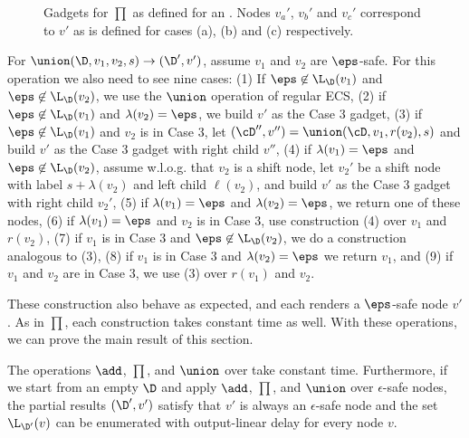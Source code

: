\begin{figure}[t]
	\caption{Gadgets for $\prod$ as defined for an \dsepsabbr. Nodes $v_a'$, $v_b'$ and $v_c'$ correspond to $v'$ as is defined for cases (a), (b) and (c) respectively.}
	\label{slps:fig-prod-multi-gadget}
\end{figure}

For $\union(\D,v_1,v_2, s) \to (\D',v')$, assume $v_1$ and $v_2$ are $\eps$-safe. 
For this operation we also need to see nine cases: (1) If $\eps\not\in\L_{\D}(v_1)$ and $\eps\not\in\L_{\D}(v_2)$, we use the $\union$ operation of regular ECS, (2) if $\eps\not\in\L_{\D}(v_1)$ and $\lambda(v_2) = \eps$, we build $v'$ as the Case 3 gadget, (3) if $\eps\not\in\L_{\D}(v_1)$ and $v_2$ is in Case 3, let $(\cD'', v'') = \union(\cD, v_1, r(v_2), s)$ and build $v'$ as the Case 3 gadget with right child $v''$, (4) if $\lambda(v_1) = \eps$ and $\eps\not\in\L_{\D}(v_2)$, assume w.l.o.g. that $v_2$ is a shift node, let $v_2'$ be a shift node with label $s + \lambda(v_2)$ and left child $\ell(v_2)$, and build $v'$ as the Case 3 gadget with right child $v_2'$, (5) if $\lambda(v_1) = \eps$ and $\lambda(v_2) = \eps$, we return one of these nodes, (6) if $\lambda(v_1) = \eps$ and $v_2$ is in Case 3, use construction (4) over $v_1$ and $ r(v_2)$, (7) if $v_1$ is in Case 3 and $\eps\not\in\L_{\D}(v_2)$, we do a construction analogous to (3), (8) if $v_1$ is in Case 3 and $\lambda(v_2) = \eps$ we return $v_1$, and (9) if $v_1$ and $v_2$ are in Case 3, we use (3) over $r(v_1)$ and $v_2$.

These construction also behave as expected, and each renders a $\eps$-safe node $v'$. As in $\prod$, each construction takes constant time as well. With these operations,	 we can prove the main result of this section.

\begin{theorem}\label{slps:theo:data-structure-eps}
	The operations $\add$, $\prod$, and $\union$ over \dsepsabbr{} take constant time. Furthermore, if we start from an empty \dsepsabbr{} $\D$ and apply $\add$, $\prod$, and $\union$ over $\epsilon$-safe nodes, the partial results $(\D', v')$ satisfy that $v'$ is always an $\epsilon$-safe node and the set $\L_{\D'}(v)$ can be enumerated with output-linear delay for every node $v$.
\end{theorem} 


